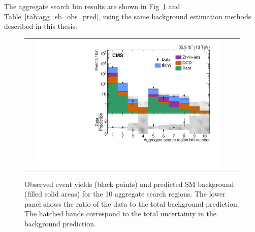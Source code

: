 The aggregate search bin results are shown in Fig~\ref{fig:aggSearchBinResults} and Table~\ref{tab:agg_sb_obs_pred}, using the same background estimation methods described in this thesis.

\begin{figure}[htb]
  \begin{center}
  \begin{tabular}{cc}
  \includegraphics[angle=0,width=0.9\textwidth]{figures/appendix/aggregatedSearchBins.pdf}
  \end{tabular}
  \caption{
  Observed event yields (black points)
  and predicted SM background (filled solid areas)
  for the 10 aggregate search regions.
  The lower panel shows the ratio of the data to
  the total background prediction.
  The hatched bands correspond to the total uncertainty in the
  background prediction.
   }
    \label{fig:aggSearchBinResults}
  \end{center}
\end{figure}

